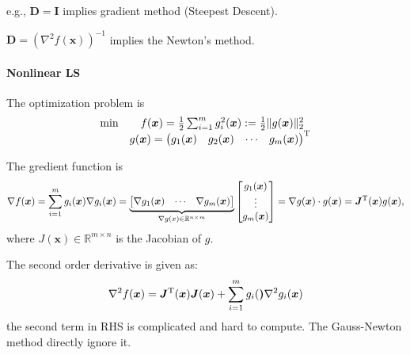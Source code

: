 e.g., $\bm D=\bm I$ implies gradient method (Steepest Descent).

$\bm D = \left(\nabla^2 f(\bm x)\right)^{-1}$ implies the Newton's method.

\paragraph{Nonlinear LS} The optimization problem is
\[
\begin{array}{ll}
\min&\quad f(\bm x) = \frac{1}{2}\sum_{i=1}^mg_i^2(\bm x):=\frac{1}{2}\|g(\bm x)\|_2^2\\
&g(\bm x)=\begin{pmatrix}
g_1(\bm x)&g_2(\bm x)&\cdots&g_m(\bm x)
\end{pmatrix}^{\mathrm T}
\end{array}
\]

The gredient function is
\[
\nabla f(\bm x)=\sum_{i=1}^mg_i(\bm x)\nabla g_i(\bm x)
=
\underbrace{\begin{bmatrix}
\nabla g_1(\bm x)&\cdots&\nabla g_m(\bm x)
\end{bmatrix}}_{\nabla g(x)\in\mathbb{R}^{n\times m}}\begin{bmatrix}
g_1(\bm x)\\\vdots\\ g_m(\bm x)
\end{bmatrix}=
\nabla g(\bm x)\cdot g(\bm x)=\bm J^{\mathrm T}(\bm x)g(\bm x),
\]
where $J(\bm x)\in\mathbb{R}^{m\times n}$ is the Jacobian of $g$.

The second order derivative is given as:
\[
\nabla^2 f(\bm x) = \bm J^{\mathrm T}(\bm x)\bm J(\bm x)+\sum_{i=1}^mg_i(\bm )\nabla^2 g_i(\bm x)
\]
the second term in RHS is complicated and hard to compute. The Gauss-Newton method directly ignore it.
